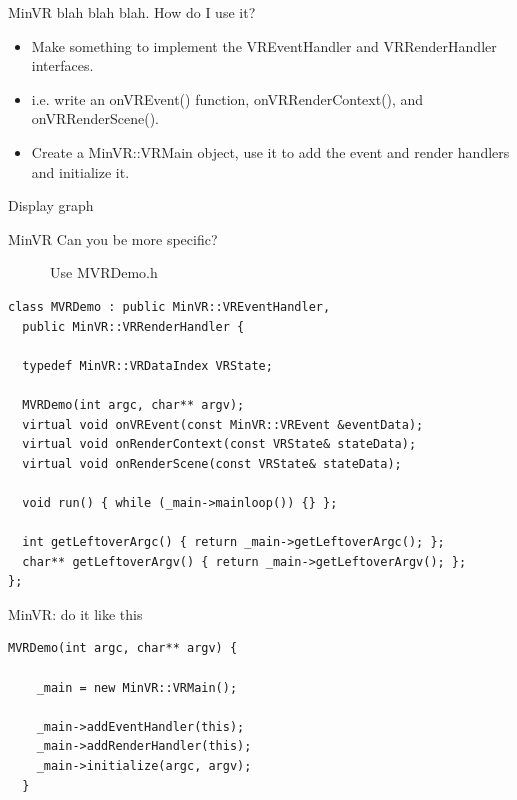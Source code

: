 \documentclass[12pt]{article}
\begin{document}
\begin{frame}{MinVR blah blah blah.  How do I use it?}

\begin{center}
\begin{minipage}{0.8\columnwidth}

\begin{itemize}\raggedright
\item Make something to implement the VREventHandler and
  VRRenderHandler interfaces.

\item i.e. write an onVREvent() function, onVRRenderContext(),
  and onVRRenderScene().

\item Create a MinVR::VRMain object, use it to add the event and
  render handlers and initialize it.
\end{itemize}


\end{minipage}
\end{center}
\end{frame}

Display graph

\begin{frame}[fragile]{MinVR Can you be more specific?}

~~~~~~Use MVRDemo.h

\begin{Verbatim}[fontsize=\small]
class MVRDemo : public MinVR::VREventHandler,
  public MinVR::VRRenderHandler {

  typedef MinVR::VRDataIndex VRState;

  MVRDemo(int argc, char** argv);
  virtual void onVREvent(const MinVR::VREvent &eventData);
  virtual void onRenderContext(const VRState& stateData);
  virtual void onRenderScene(const VRState& stateData);

  void run() { while (_main->mainloop()) {} };

  int getLeftoverArgc() { return _main->getLeftoverArgc(); };
  char** getLeftoverArgv() { return _main->getLeftoverArgv(); };
};
\end{Verbatim}
\end{frame}

\begin{frame}[fragile]{MinVR: do it like this}

\begin{Verbatim}[fontsize=\small]
  MVRDemo(int argc, char** argv) {

    _main = new MinVR::VRMain();

    _main->addEventHandler(this);
    _main->addRenderHandler(this);
    _main->initialize(argc, argv);
  }
\end{Verbatim}
\end{frame}
\end{document}
